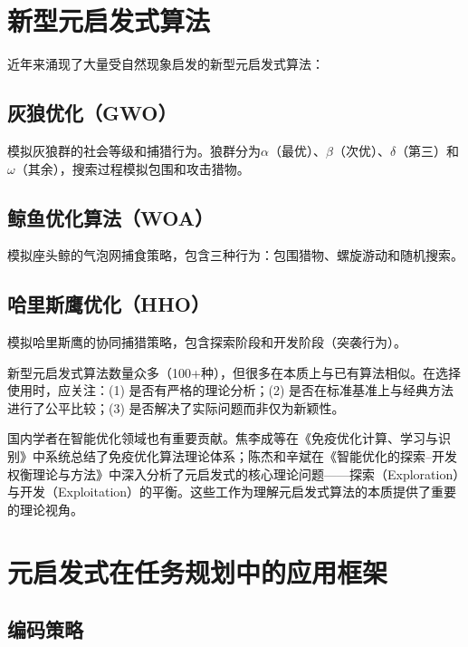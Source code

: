 \section{新型元启发式算法 \self}

近年来涌现了大量受自然现象启发的新型元启发式算法：

\subsection{灰狼优化（GWO）}

模拟灰狼群的社会等级和捕猎行为。狼群分为$\alpha$（最优）、$\beta$（次优）、$\delta$（第三）和$\omega$（其余），搜索过程模拟包围和攻击猎物。

\subsection{鲸鱼优化算法（WOA）}

模拟座头鲸的气泡网捕食策略，包含三种行为：包围猎物、螺旋游动和随机搜索。

\subsection{哈里斯鹰优化（HHO）}

模拟哈里斯鹰的协同捕猎策略，包含探索阶段和开发阶段（突袭行为）。

\begin{remark}
新型元启发式算法数量众多（100+种），但很多在本质上与已有算法相似。在选择使用时，应关注：(1) 是否有严格的理论分析；(2) 是否在标准基准上与经典方法进行了公平比较；(3) 是否解决了实际问题而非仅为新颖性。

国内学者在智能优化领域也有重要贡献。焦李成等在《免疫优化计算、学习与识别》中系统总结了免疫优化算法理论体系；陈杰和辛斌在《智能优化的探索--开发权衡理论与方法》中深入分析了元启发式的核心理论问题——探索（Exploration）与开发（Exploitation）的平衡。这些工作为理解元启发式算法的本质提供了重要的理论视角。
\end{remark}

\section{元启发式在任务规划中的应用框架}

\subsection{编码策略}

